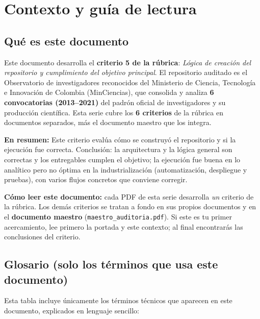 \section{Contexto y guía de lectura}

\subsection{Qué es este documento}

Este documento desarrolla el \textbf{criterio 5 de la rúbrica}:
\emph{Lógica de creación del repositorio y cumplimiento del objetivo principal}. El repositorio auditado es el
Observatorio de investigadores reconocidos del Ministerio de Ciencia,
Tecnología e Innovación de Colombia (MinCiencias), que consolida y analiza
\textbf{6 convocatorias (2013--2021)} del padrón oficial de investigadores
y su producción científica. Esta serie cubre los \textbf{6 criterios} de la
rúbrica en documentos separados, más el documento maestro que los integra.

\textbf{En resumen:} Este criterio evalúa cómo se construyó el repositorio y si la ejecución fue correcta. Conclusión: la arquitectura y la lógica general son correctas y los entregables cumplen el objetivo; la ejecución fue buena en lo analítico pero no óptima en la industrialización (automatización, despliegue y pruebas), con varios flujos concretos que conviene corregir.




\begin{tcolorbox}[nota]
\textbf{Cómo leer este documento:} cada PDF de esta serie desarrolla \emph{un}
criterio de la rúbrica. Los demás criterios se tratan a fondo en sus propios
documentos y en el \textbf{documento maestro} (\texttt{maestro\_auditoria.pdf}).
Si este es tu primer acercamiento, lee primero la portada y este contexto; al
final encontrarás las conclusiones del criterio.
\end{tcolorbox}

\subsection{Glosario (solo los términos que usa este documento)}

Esta tabla incluye únicamente los términos técnicos que aparecen en este
documento, explicados en lenguaje sencillo:

